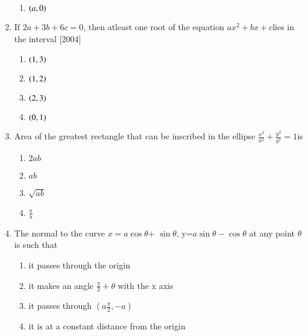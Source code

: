 \documentclass[journal,12pt,twocolumn]{IEEEtran}
\theoremstyle{remark}
\begin{document}
\begin{enumerate}
\begin{multicols}{2}
\begin{enumerate}
													        \item $\left(a,0\right)$
														\end{enumerate}
														\end{multicols}
														\item If $2a+3b+6c=0$, then atleast one root of the equation $ax^2+bx+c$lies in the interval \hfill{[2004]}
														\begin{multicols}{2}
														\begin{enumerate}
														    \item $\left(1,3\right)$
														        \item $\left(1,2\right)$
															    \item $\left(2,3\right)$
															        \item $\left(0,1\right)$
																\end{enumerate}
																\end{multicols}  
																 \item Area of the greatest rectangle that can be inscribed in the ellipse $\frac{x^2}{a^2}+\frac{y^2}{b^2}=1$is
																 \begin{multicols}{2}
																 \begin{enumerate}
																     \item $2ab$
																         \item $ab$
																	     \item $\sqrt{ab}$
																	         \item $\frac{a}{b}$
																		 \end{enumerate}
																		 \end{multicols}
																		 \item The normal to the curve $x=a \cos \theta$+ $\sin\theta$, y=$a\sin\theta - \cos \theta$ at any point $\theta$is such that
																		 \begin{multicols}{2}
																		 \begin{enumerate}
																		     \item it passes through the origin
																		         \item it makes an angle $\frac{\pi}{2}+\theta$ with the x axis
																			     \item it passes through $(a\frac{\pi}{2},-a)$
																			         \item it is at a constant distance from the origin
																				 \end{enumerate}
																				 \end{multicols}
																				 \end{enumerate}
\end{document}
